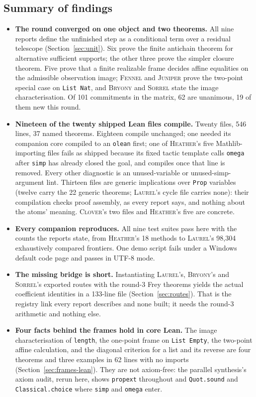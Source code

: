 \documentclass[11pt,a4paper]{article}
\newcommand{\code}[1]{\nolinkurl{#1}}
\newcommand{\Br}{\textsc{Bryony}}
\newcommand{\Cl}{\textsc{Clover}}
\newcommand{\Fe}{\textsc{Fennel}}
\newcommand{\He}{\textsc{Heather}}
\newcommand{\Ju}{\textsc{Juniper}}
\newcommand{\La}{\textsc{Laurel}}
\newcommand{\So}{\textsc{Sorrel}}
\theoremstyle{definition}
\theoremstyle{plain}
\begin{document}
\subsection{Summary of findings}
\begin{itemize}
\item \textbf{The round converged on one object and two theorems.} All nine reports define the unfinished step as a conditional term over a residual telescope (Section~\ref{sec:unit}). Six prove the finite antichain theorem for alternative sufficient supports; the other three prove the simpler closure theorem. Five prove that a finite realizable frame decides affine equalities on the admissible observation image; \Fe{} and \Ju{} prove the two-point special case on \code{List Nat}, and \Br{} and \So{} state the image characterisation. Of 101 commitments in the matrix, 62 are unanimous, 19 of them new this round.
\item \textbf{Nineteen of the twenty shipped Lean files compile.} Twenty files, 546 lines, 37 named theorems. Eighteen compile unchanged; one needed its companion core compiled to an \code{olean} first; one of \He's five Mathlib-importing files fails as shipped because its fixed tactic template calls \code{omega} after \code{simp} has already closed the goal, and compiles once that line is removed. Every other diagnostic is an unused-variable or unused-simp-argument lint. Thirteen files are generic implications over \code{Prop} variables (twelve carry the 22 generic theorems; \La's cycle file carries none): their compilation checks proof assembly, as every report says, and nothing about the atoms' meaning. \Cl's two files and \He's five are concrete.
\item \textbf{Every companion reproduces.} All nine test suites pass here with the counts the reports state, from \He's 18 methods to \La's 98,304 exhaustively compared frontiers. One demo script fails under a Windows default code page and passes in UTF-8 mode.
\item \textbf{The missing bridge is short.} Instantiating \La's, \Br's and \So's exported routes with the round-3 Frey theorems yields the actual coefficient identities in a 133-line file (Section~\ref{sec:routes}). That is the registry link every report describes and none built; it needs the round-3 arithmetic and nothing else.
\item \textbf{Four facts behind the frames hold in core Lean.} The image characterisation of \code{length}, the one-point frame on \code{List Empty}, the two-point affine calculation, and the diagonal criterion for a list and its reverse are four theorems and three examples in 62 lines with no imports (Section~\ref{sec:frames-lean}). They are not axiom-free: the parallel synthesis's axiom audit, rerun here, shows \code{propext} throughout and \code{Quot.sound} and \code{Classical.choice} where \code{simp} and \code{omega} enter.

\end{itemize}
\end{document}
